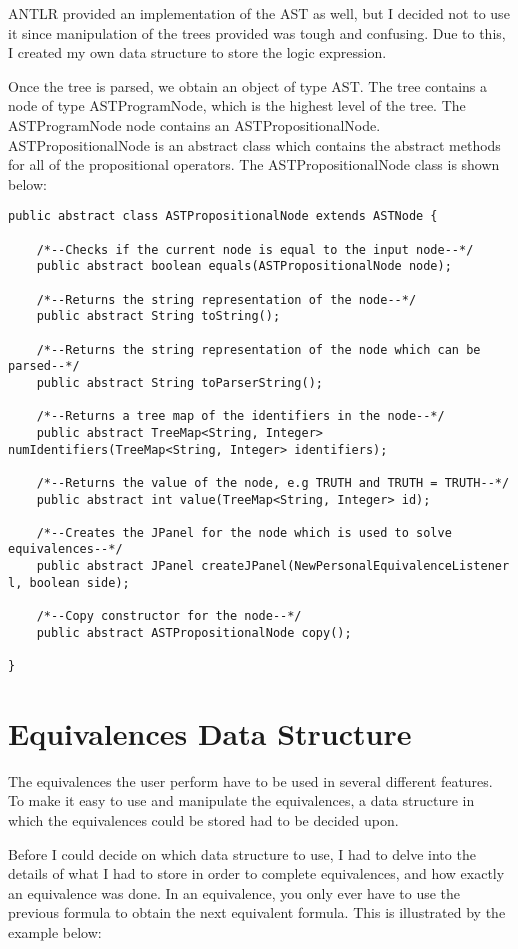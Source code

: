 \documentclass{report}
\begin{document}
ANTLR provided an implementation of the AST as well, but I decided not to use it
since manipulation of the trees provided was tough and confusing. Due to this,
I created my own data structure to store the logic expression.

Once the tree is parsed, we obtain an object of type AST. The tree contains
a node of type ASTProgramNode, which is the highest level of the tree. The ASTProgramNode
node contains an ASTPropositionalNode. ASTPropositionalNode is an abstract class
which contains the abstract methods for all of the propositional operators. The
ASTPropositionalNode class is shown below:

\begin{verbatim}
public abstract class ASTPropositionalNode extends ASTNode {

	/*--Checks if the current node is equal to the input node--*/
	public abstract boolean equals(ASTPropositionalNode node);

	/*--Returns the string representation of the node--*/
	public abstract String toString();

	/*--Returns the string representation of the node which can be parsed--*/
	public abstract String toParserString();

	/*--Returns a tree map of the identifiers in the node--*/
	public abstract TreeMap<String, Integer> numIdentifiers(TreeMap<String, Integer> identifiers);
	
	/*--Returns the value of the node, e.g TRUTH and TRUTH = TRUTH--*/
	public abstract int value(TreeMap<String, Integer> id);

	/*--Creates the JPanel for the node which is used to solve equivalences--*/
	public abstract JPanel createJPanel(NewPersonalEquivalenceListener l, boolean side);
	
	/*--Copy constructor for the node--*/
	public abstract ASTPropositionalNode copy();

}
\end{verbatim}

\section{Equivalences Data Structure}

The equivalences the user perform have to be used in several different features.
To make it easy to use and manipulate the equivalences, a data structure in which
the equivalences could be stored had to be decided upon. 

Before I could decide on which data structure to use, I had to delve into the details
of what I had to store in order to complete equivalences, and how exactly an
equivalence was done. In an equivalence, you only ever have to use the previous
formula to obtain the next equivalent formula. This is illustrated by the 
example below:
\end{document}
